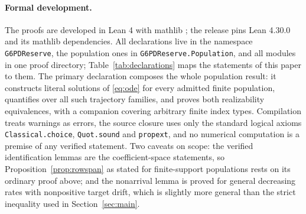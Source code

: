 \documentclass[11pt]{article}
\theoremstyle{definition}
\newcommand{\code}[1]{\texttt{\small #1}}
\begin{document}
\paragraph{Formal development.}
The proofs are developed in Lean 4 \cite{lean4} with mathlib \cite{mathlib};
the release pins Lean 4.30.0 and its mathlib dependencies. All declarations
live in the namespace \code{G6PDReserve}, the population ones in
\code{G6PDReserve.Population}, and all modules in one proof directory;
Table~\ref{tab:declarations} maps the statements of this paper to them. The
primary declaration composes the whole population result: it constructs
literal solutions of \eqref{eq:ode} for every admitted finite population,
quantifies over all such trajectory families, and proves both realizability
equivalences, with a companion covering arbitrary finite index types.
Compilation treats warnings as errors, the source closure uses only the
standard logical axioms \code{Classical.choice}, \code{Quot.sound} and
\code{propext}, and no numerical computation is a premise of any verified
statement. Two caveats on scope: the verified identification lemmas are the
coefficient-space statements, so Proposition~\ref{prop:rowspan} as stated for
finite-support populations rests on its ordinary proof above; and the
nonarrival lemma is proved for general decreasing rates with nonpositive
target drift, which is slightly more general than the strict inequality used
in Section~\ref{sec:main}.
\end{document}
